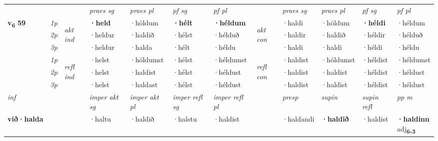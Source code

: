 \begin{longtable}[l]{X>{\footnotesize\itshape}llXXXXlXXXX}
\midrule

 & &   & \textit{praes sg}  & \textit{praes pl}    & \textit{ pf sg} & \textit{pf pl} & & \textit{praes sg}  & \textit{praes pl}    & \textit{pf sg} & \textit{pf pl }  \\ \cmidrule{4-7} \cmidrule{9-12}
 \multirow{2}{*}{{{\textbf{v{\textsubscript{6}}} \Large{\textbf{59}}}}}  & 1p & \multirow{3}{*}{\begin{turn}{90}\textit{akt ind}\end{turn}} & \textbf{·held} & ·höldum & \textbf{·hélt} & \textbf{·héldum} & \multirow{3}{*}{\begin{turn}{90}\textit{akt con}\end{turn}} &·haldi & ·höldum & \textbf{·héldi} & ·héldum\\*
 & 2p &  &  ·heldur  & ·haldið & ·hélst & ·hélduð & & ·haldir & ·haldið & ·héldir & ·hélduð \\*
 & 3p &  & ·heldur & ·halda & ·hélt & ·héldu & & ·haldi & ·haldi& ·héldi & ·héldu \\*
\cmidrule{4-7} \cmidrule{9-12}
 & 1p & \multirow{3}{*}{\begin{turn}{90}\textit{refl ind}\end{turn}}  & ·helst & ·höldumst & ·hélst & ·héldumst & \multirow{3}{*}{\begin{turn}{90}\textit{refl con}\end{turn}}  &·haldist & ·höldumst & ·héldist & ·héldumst \\*
 & 2p &  & ·helst & ·haldist & ·hélst & ·héldust & &·haldist & ·haldist & ·héldist & ·héldust \\*
 & 3p  & & ·helst & ·haldast & ·hélst & ·héldust & & ·haldist & ·haldist& ·héldist & ·héldust \\*
\cmidrule{4-7} \cmidrule{9-12}

   {\textit{inf}} & &  & \textit{imper akt sg} & \textit{imper akt pl} & \textit{imper refl sg} & \textit{imper refl pl} && \textit{presp} & \textit{supin} & \textit{supin refl} & \textit{pp m} \\*
  {\textbf{við\allowbreak ·halda}} & && ·haltu  & ·haldið & ·halstu & ·haldist && ·haldandi &  \textbf{·haldið} & ·haldist & \specialcell{\textbf{·haldinn} \\ adj\textbf{\textsubscript{6-3}}} \\*

\midrule


\end{longtable}
